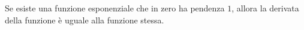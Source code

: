 % 
% 
% 

Se esiste una funzione esponenziale che in zero ha pendenza \(1\), 
allora la derivata della funzione è uguale alla funzione stessa.

